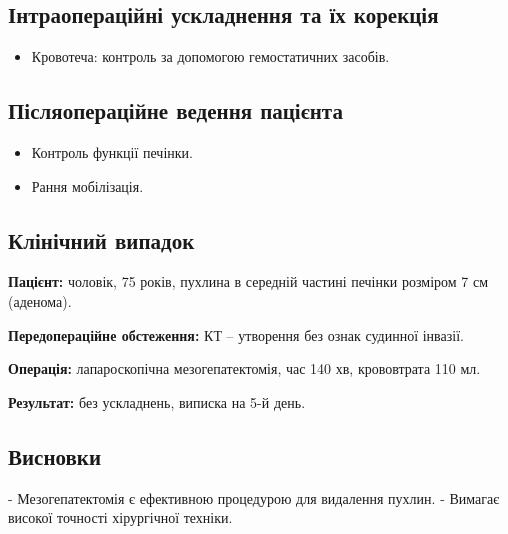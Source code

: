 \begin{refsection}
\subsection{Інтраопераційні ускладнення та їх корекція}
\begin{itemize}
    \item Кровотеча: контроль за допомогою гемостатичних засобів.
\end{itemize}

\subsection{Післяопераційне ведення пацієнта}
\begin{itemize}
    \item Контроль функції печінки.
    \item Рання мобілізація.
\end{itemize}

\subsection{Клінічний випадок}
\textbf{Пацієнт:} чоловік, 75 років, пухлина в середній частині печінки розміром 7 см (аденома).

\textbf{Передопераційне обстеження:} КТ – утворення без ознак судинної інвазії.

\textbf{Операція:} лапароскопічна мезогепатектомія, час 140 хв, крововтрата 110 мл.

\textbf{Результат:} без ускладнень, виписка на 5-й день.

\subsection{Висновки}
- Мезогепатектомія є ефективною процедурою для видалення пухлин.
- Вимагає високої точності хірургічної техніки.

\printbibliography [heading=subbibliography]
\end{refsection}